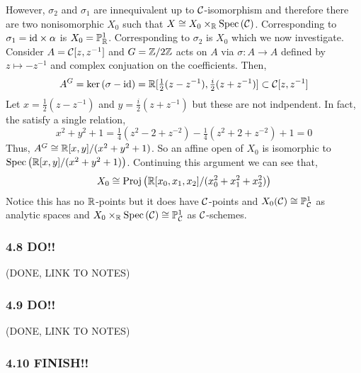 \documentclass[12pt]{article}
\begin{document}
\begin{enumerate}
\begin{center}
\end{center}
However, $\sigma_2$ and $\sigma_1$ are innequivalent up to $\C$-isomorphism and therefore there are two nonisomorphic $X_0$ such that $X \cong X_0 \times_\R \Spec{\C}$. Corresponding to $\sigma_1 = \mathrm{id} \times \alpha$ is $X_0 = \mathbb{P}^1_{\mathbb{R}}$. Corresponding to $\sigma_2$ is $X_0$ which we now investigate.
\bigskip\\
Consider $A = \C[z, z^{-1}]$ and $G = \mathbb{Z} / 2\mathbb{Z}$ acts on $A$ via $\sigma : A \to A$ defined by $z \mapsto - z^{-1}$ and complex conjuation on the coefficients. Then,
\[ A^G = \ker{(\sigma - \id)} = \R[\tfrac{1}{2}(z - z^{-1}), \tfrac{i}{2}(z + z^{-1})] \subset \C[z, z^{-1}] \]
Let $x = \tfrac{1}{2}(z - z^{-1})$ and $y = \tfrac{i}{2}(z + z^{-1})$ but these are not indpendent. In fact, the satisfy a single relation,
\[ x^2 + y^2 + 1 = \tfrac{1}{4} (z^2 - 2 + z^{-2}) - \tfrac{1}{4} (z^2 + 2 + z^{-2}) + 1 = 0 \]
Thus, $A^G \cong \mathbb{R}[x,y]/(x^2 + y^2 + 1)$. So an affine open of $X_0$ is isomorphic to $\mathrm{Spec}\left( \mathbb{R}[x,y]/(x^2 + y^2 + 1) \right)$. Continuing this argument we can see that,
\[ X_0 \cong \mathrm{Proj}\left( \mathbb{R}[x_0, x_1, x_2]/(x_0^2 + x_1^2 + x_2^2) \right) \]
Notice this has no $\mathbb{R}$-points but it does have $\C$-points and $X_0(\C) \cong \P^1_\C$ as analytic spaces and $X_0 \times_\R \Spec{\C} \cong \P^1_\C$ as $\C$-schemes.
\end{enumerate}

\renewcommand{\C}{\mathcal{C}}

\subsubsection{4.8 DO!!}

(DONE, LINK TO NOTES)

\subsubsection{4.9 DO!!}

(DONE, LINK TO NOTES)

\subsubsection{4.10 FINISH!!}
\end{document}

